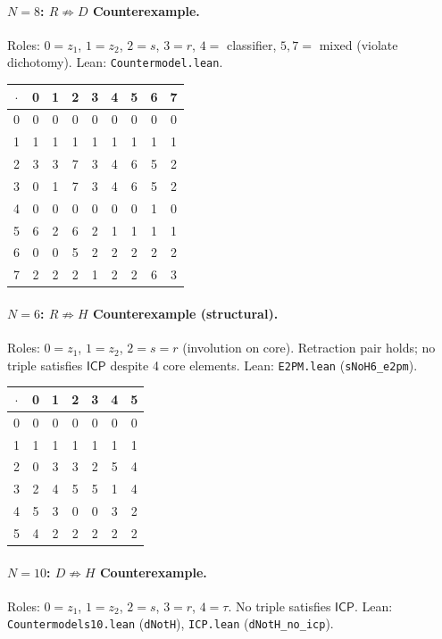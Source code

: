 \documentclass[sigconf,screen]{acmart}
\newcommand{\dotop}{\cdot}
\newcommand{\ICP}{\textsf{ICP}}
\theoremstyle{remark}
\begin{document}
\paragraph{$N\!=\!8$: $R \not\Rightarrow D$ Counterexample.}
Roles: $0 = z_1$, $1 = z_2$, $2 = s$, $3 = r$, $4 =$ classifier, $5, 7 =$ mixed (violate dichotomy). \quad Lean: \texttt{Countermodel.lean}.

\medskip
{\small
\begin{tabular}{c|cccccccc}
$\dotop$ & 0 & 1 & 2 & 3 & 4 & 5 & 6 & 7 \\\hline
0 & 0 & 0 & 0 & 0 & 0 & 0 & 0 & 0 \\
1 & 1 & 1 & 1 & 1 & 1 & 1 & 1 & 1 \\
2 & 3 & 3 & 7 & 3 & 4 & 6 & 5 & 2 \\
3 & 0 & 1 & 7 & 3 & 4 & 6 & 5 & 2 \\
4 & 0 & 0 & 0 & 0 & 0 & 0 & 1 & 0 \\
5 & 6 & 2 & 6 & 2 & 1 & 1 & 1 & 1 \\
6 & 0 & 0 & 5 & 2 & 2 & 2 & 2 & 2 \\
7 & 2 & 2 & 2 & 1 & 2 & 2 & 6 & 3 \\
\end{tabular}}

\paragraph{$N\!=\!6$: $R \not\Rightarrow H$ Counterexample (structural).}
Roles: $0 = z_1$, $1 = z_2$, $2 = s = r$ (involution on core). Retraction pair holds; no triple satisfies $\ICP$ despite 4 core elements. \quad Lean: \texttt{E2PM.lean} (\texttt{sNoH6\_e2pm}).

\medskip
{\small
\begin{tabular}{c|cccccc}
$\dotop$ & 0 & 1 & 2 & 3 & 4 & 5 \\\hline
0 & 0 & 0 & 0 & 0 & 0 & 0 \\
1 & 1 & 1 & 1 & 1 & 1 & 1 \\
2 & 0 & 3 & 3 & 2 & 5 & 4 \\
3 & 2 & 4 & 5 & 5 & 1 & 4 \\
4 & 5 & 3 & 0 & 0 & 3 & 2 \\
5 & 4 & 2 & 2 & 2 & 2 & 2 \\
\end{tabular}}

\paragraph{$N\!=\!10$: $D \not\Rightarrow H$ Counterexample.}
Roles: $0 = z_1$, $1 = z_2$, $2 = s$, $3 = r$, $4 = \tau$. No triple satisfies $\ICP$. \quad Lean: \texttt{Countermodels10.lean} (\texttt{dNotH}), \texttt{ICP.lean} (\texttt{dNotH\_no\_icp}).
\end{document}
